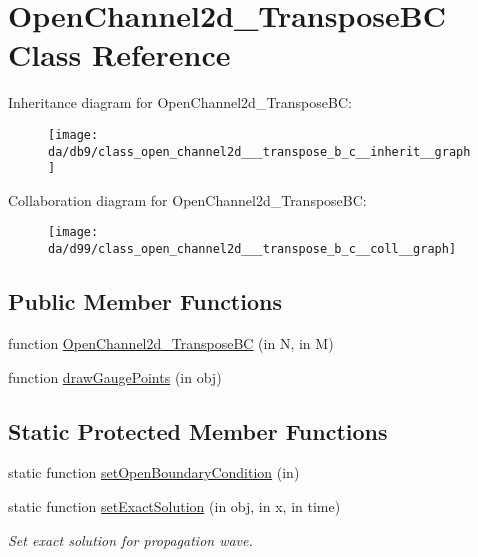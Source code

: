 \hypertarget{class_open_channel2d___transpose_b_c}{}\section{Open\+Channel2d\+\_\+\+Transpose\+BC Class Reference}
\label{class_open_channel2d___transpose_b_c}


Inheritance diagram for Open\+Channel2d\+\_\+\+Transpose\+BC\+:
\nopagebreak
\begin{figure}[H]
\begin{center}
\leavevmode
\texttt{[image: da/db9/class\_open\_channel2d\_\_\_transpose\_b\_c\_\_inherit\_\_graph]}
\end{center}
\end{figure}


Collaboration diagram for Open\+Channel2d\+\_\+\+Transpose\+BC\+:
\nopagebreak
\begin{figure}[H]
\begin{center}
\leavevmode
\texttt{[image: da/d99/class\_open\_channel2d\_\_\_transpose\_b\_c\_\_coll\_\_graph]}
\end{center}
\end{figure}
\subsection*{Public Member Functions}
\begin{DoxyCompactItemize}
\item 
function \hyperlink{class_open_channel2d___transpose_b_c_abfe551a4329f1c78b0b28db8bc43a5d5}{Open\+Channel2d\+\_\+\+Transpose\+BC} (in N, in M)
\item 
function \hyperlink{class_open_channel2d___transpose_b_c_a2a769b88f314a064aed71fea813ca348}{draw\+Gauge\+Points} (in obj)
\end{DoxyCompactItemize}
\subsection*{Static Protected Member Functions}
\begin{DoxyCompactItemize}
\item 
static function \hyperlink{class_open_channel2d___transpose_b_c_afb7af5e5b5b257ed89c533255b323107}{set\+Open\+Boundary\+Condition} (in)
\item 
static function \hyperlink{class_open_channel2d___transpose_b_c_a3cc1b2758992fb7de13911c04412b4bc}{set\+Exact\+Solution} (in obj, in x, in time)
\begin{DoxyCompactList}\small\item\em Set exact solution for propagation wave. \end{DoxyCompactList}\end{DoxyCompactItemize}
